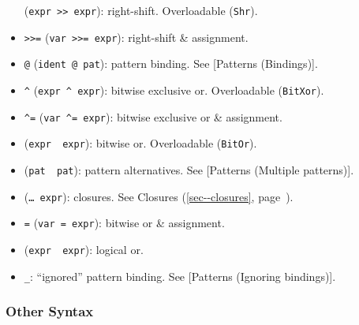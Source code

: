 \documentclass[a4paper,]{book}
\renewcommand*{\hyperref}[2][\ar]{%
  \def\ar{#2}%
  #2 (\autoref{#1}, page~\pageref{#1})}
\begin{document}
\begin{itemize}
  (\texttt{expr\ \textgreater{}\textgreater{}\ expr}): right-shift.
  Overloadable (\texttt{Shr}).
\item
  \texttt{\textgreater{}\textgreater{}=}
  (\texttt{var\ \textgreater{}\textgreater{}=\ expr}): right-shift \&
  assignment.
\item
  \texttt{@} (\texttt{ident\ @\ pat}): pattern binding. See {[}Patterns
  (Bindings){]}.
\item
  \texttt{\^{}} (\texttt{expr\ \^{}\ expr}): bitwise exclusive or.
  Overloadable (\texttt{BitXor}).
\item
  \texttt{\^{}=} (\texttt{var\ \^{}=\ expr}): bitwise exclusive or \&
  assignment.
\item
  \texttt{\textbar{}} (\texttt{expr\ \textbar{}\ expr}): bitwise or.
  Overloadable (\texttt{BitOr}).
\item
  \texttt{\textbar{}} (\texttt{pat\ \textbar{}\ pat}): pattern
  alternatives. See {[}Patterns (Multiple patterns){]}.
\item
  \texttt{\textbar{}} (\texttt{\textbar{}\ldots{}\textbar{}\ expr}):
  closures. See \hyperref[sec--closures]{Closures}.
\item
  \texttt{\textbar{}=} (\texttt{var\ \textbar{}=\ expr}): bitwise or \&
  assignment.
\item
  \texttt{\textbar{}\textbar{}}
  (\texttt{expr\ \textbar{}\textbar{}\ expr}): logical or.
\item
  \texttt{\_}: ``ignored'' pattern binding. See {[}Patterns (Ignoring
  bindings){]}.
\end{itemize}

\subsubsection{Other Syntax}\label{other-syntax}
\end{document}
